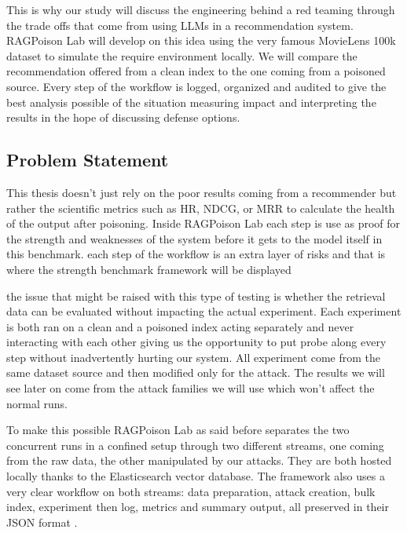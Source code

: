 This is why our study will discuss the engineering behind a red teaming through the trade offs that come from using LLMs in a recommendation system. RAGPoison Lab will develop on this idea using the very famous MovieLens 100k dataset to simulate the require environment locally. We will compare the recommendation offered from a clean index to the one coming from a poisoned source. Every step of the workflow is logged, organized and audited to give the best analysis possible of the situation measuring impact and interpreting the results in the hope of discussing defense options\cite{perez2022redteaming,mazeika2024harmbench,harper2015movielens,ragpoisonlab_repo}.

\subsection{Problem Statement}

This thesis doesn't just rely on the poor results coming from a recommender but rather the scientific metrics such as HR, NDCG, or MRR to calculate the health of the output after poisoning. Inside RAGPoison Lab each step is use as proof for the strength and weaknesses of the system before it gets to the model itself in this benchmark. each step of the workflow is an extra layer of risks and that is where the strength benchmark framework will be displayed\cite{herlocker2004evaluating,wang2013ndcg,ragpoisonlab_repo}

the issue that might be raised with this type of testing is whether the retrieval data can be evaluated without impacting the actual experiment. Each experiment is both ran on a clean and a poisoned index acting separately and never interacting with each other giving us the opportunity to put probe along every step without inadvertently hurting our system. All experiment come from the same dataset source and then modified only for the attack. The results we will see later on come from the attack families we will use which won't affect the normal runs\cite{ragpoisonlab_repo}.

To make this possible RAGPoison Lab as said before separates the two concurrent runs in a confined setup through two different streams, one coming from the raw data, the other manipulated by our attacks. They are both hosted locally thanks to the Elasticsearch vector database. The framework also uses a very clear workflow on both streams: data preparation, attack creation, bulk index, experiment then log, metrics and summary output, all preserved in their JSON format \cite{harper2015movielens,ragpoisonlab_repo}.

